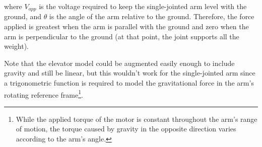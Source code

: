 where $V_{app}$ is the voltage required to keep the single-jointed arm level
with the ground, and $\theta$ is the angle of the arm relative to the ground.
Therefore, the force applied is greatest when the arm is parallel with the
ground and zero when the arm is perpendicular to the ground (at that point, the
joint supports all the weight).

Note that the elevator model could be augmented easily enough to include gravity
and still be linear, but this wouldn't work for the single-jointed arm since a
trigonometric function is required to model the gravitational force in the arm's
rotating reference frame\footnote{While the applied torque of the motor is
constant throughout the arm's range of motion, the torque caused by gravity in
the opposite direction varies according to the arm's angle.}.
